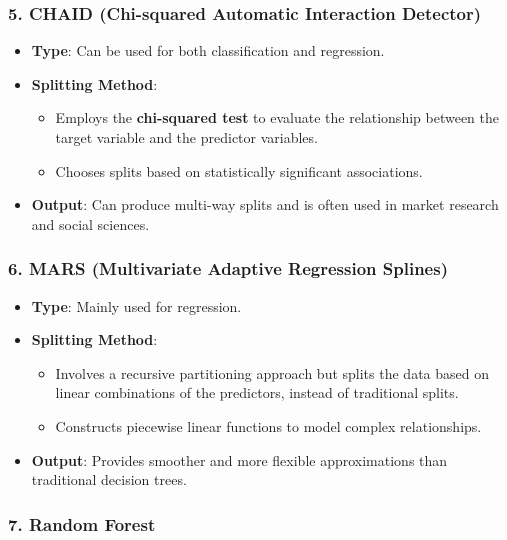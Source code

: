 \documentclass[12pt]{book}
\providecommand{\tightlist}{%
  \setlength{\itemsep}{0pt}\setlength{\parskip}{0pt}}
\begin{document}
\subsubsection{5. CHAID (Chi-squared Automatic Interaction
Detector)}\label{chaid-chi-squared-automatic-interaction-detector}

\begin{itemize}
\tightlist
\item
  \textbf{Type}: Can be used for both classification and regression.
\item
  \textbf{Splitting Method}:

  \begin{itemize}
  \tightlist
  \item
    Employs the \textbf{chi-squared test} to evaluate the relationship
    between the target variable and the predictor variables.
  \item
    Chooses splits based on statistically significant associations.
  \end{itemize}
\item
  \textbf{Output}: Can produce multi-way splits and is often used in
  market research and social sciences.
\end{itemize}

\subsubsection{6. MARS (Multivariate Adaptive Regression
Splines)}\label{mars-multivariate-adaptive-regression-splines}

\begin{itemize}
\tightlist
\item
  \textbf{Type}: Mainly used for regression.
\item
  \textbf{Splitting Method}:

  \begin{itemize}
  \tightlist
  \item
    Involves a recursive partitioning approach but splits the data based
    on linear combinations of the predictors, instead of traditional
    splits.
  \item
    Constructs piecewise linear functions to model complex
    relationships.
  \end{itemize}
\item
  \textbf{Output}: Provides smoother and more flexible approximations
  than traditional decision trees.
\end{itemize}

\subsubsection{7. Random Forest}\label{random-forest}
\end{document}

